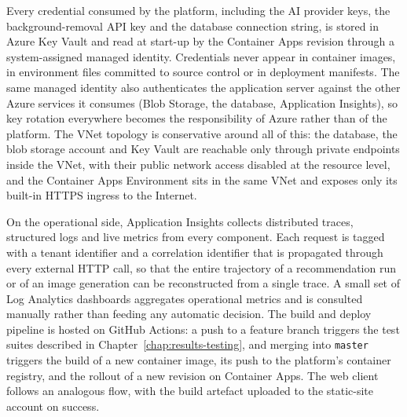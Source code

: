 Every credential consumed by the platform, including the AI provider keys, the background-removal API key and the database connection string, is stored in Azure Key Vault and read at start-up by the Container Apps revision through a system-assigned managed identity. Credentials never appear in container images, in environment files committed to source control or in deployment manifests. The same managed identity also authenticates the application server against the other Azure services it consumes (Blob Storage, the database, Application Insights), so key rotation everywhere becomes the responsibility of Azure rather than of the platform. The VNet topology is conservative around all of this: the database, the blob storage account and Key Vault are reachable only through private endpoints inside the VNet, with their public network access disabled at the resource level, and the Container Apps Environment sits in the same VNet and exposes only its built-in HTTPS ingress to the Internet.

On the operational side, Application Insights collects distributed traces, structured logs and live metrics from every component. Each request is tagged with a tenant identifier and a correlation identifier that is propagated through every external HTTP call, so that the entire trajectory of a recommendation run or of an image generation can be reconstructed from a single trace. A small set of Log Analytics dashboards aggregates operational metrics and is consulted manually rather than feeding any automatic decision. The build and deploy pipeline is hosted on GitHub Actions: a push to a feature branch triggers the test suites described in Chapter~\ref{chap:results-testing}, and merging into \texttt{master} triggers the build of a new container image, its push to the platform's container registry, and the rollout of a new revision on Container Apps. The web client follows an analogous flow, with the build artefact uploaded to the static-site account on success.


